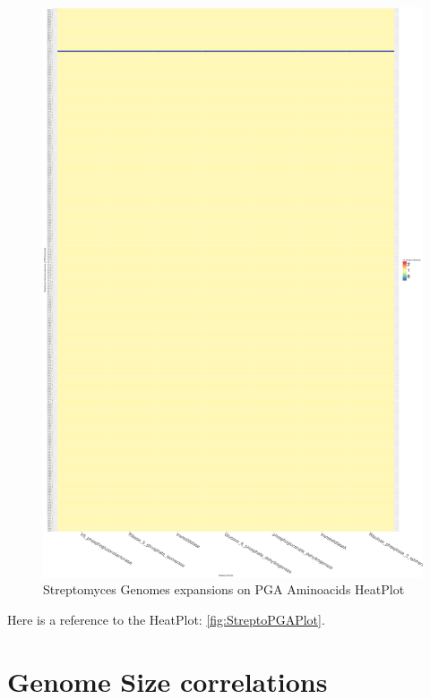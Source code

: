 \documentclass[12pt,twoside]{reedthesis}
\begin{document}
  \begin{figure}[h!tbp]
  \centering
  \includegraphics[angle = 0,scale = 0.7]{chapter2/Actinobacteria/HeatPlotStreptoPGA.pdf}
  \caption[Streptomyces Genomes expansions on PGA Aminoacids HeatPlot]{\normalsize{Streptomyces Genomes expansions on PGA Aminoacids HeatPlot}}
  \label{fig:StreptoPGAPlot}
  \end{figure}
  
  Here is a reference to the HeatPlot: \autoref{fig:StreptoPGAPlot}.
  \clearpage 
  
  \section{Genome Size correlations}\label{genome-size-correlations-1}
  
\end{document}
